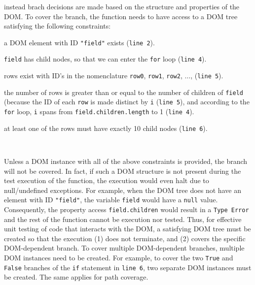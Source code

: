 instead brach decisions are made based on the structure and properties of the DOM.
To cover the  branch, the function  needs to have access to a DOM tree  satisfying the following constraints:
\\
\begin{sloppy}
\begin {compactitem}
\item a DOM element with ID {\tt "field"} exists ({\tt line 2}).
\item {\tt field} has child nodes, so that we can enter the {\tt for} loop ({\tt line 4}).
\item rows exist with ID's in the nomenclature {\tt row0}, {\tt row1}, {\tt row2}, $\dots$,  ({\tt line 5}).
\item the number of rows is greater than or equal to the number of children of {\tt field} (because the ID of each {\tt row} is made distinct by {\tt i} ({\tt line 5}),   and according to the {\tt for} loop, {\tt i} spans from {\tt field.children.length} to 1 ({\tt line 4}).
\item at least one of the rows must have exactly 10 child nodes ({\tt line 6}).
\end {compactitem}
\end{sloppy}
\ \

Unless a DOM instance with all of the above constraints is provided, the  branch will not be covered. In fact, if such a DOM structure is not present during the test execution of the function, the execution would even halt due to null/undefined exceptions. For example, when the DOM tree does not have an element with ID {\tt "field"}, the variable {\tt field} would have a {\tt null} value. Consequently, the property access {\tt field.children} would result in a {\tt Type Error} and the rest of the function cannot be execution  nor tested. Thus, for effective unit testing of \js code that interacts with the DOM, a satisfying DOM tree must be created so that the execution (1) does not terminate, and (2) covers the specific DOM-dependent branch. 
%
To cover multiple DOM-dependent branches, multiple DOM instances need to be created. For example, to cover the two {\tt True} and {\tt False} branches of the {\tt if} statement in {\tt line 6}, two separate DOM instances must be created.  %
The same applies for path coverage. %

